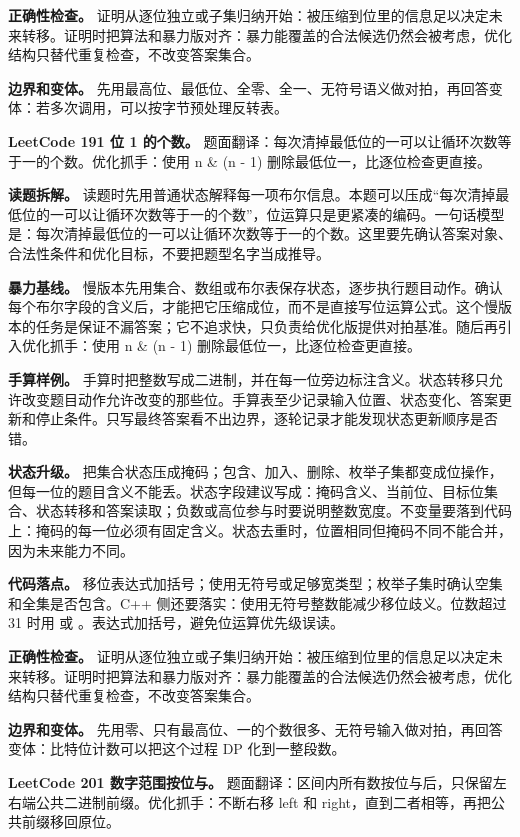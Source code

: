 \textbf{正确性检查。} 证明从逐位独立或子集归纳开始：被压缩到位里的信息足以决定未来转移。证明时把算法和暴力版对齐：暴力能覆盖的合法候选仍然会被考虑，优化结构只替代重复检查，不改变答案集合。

\textbf{边界和变体。} 先用最高位、最低位、全零、全一、无符号语义做对拍，再回答变体：若多次调用，可以按字节预处理反转表。

\noindent\textbf{LeetCode 191 位 1 的个数。} 题面翻译：每次清掉最低位的一可以让循环次数等于一的个数。优化抓手：使用 n \& (n - 1) 删除最低位一，比逐位检查更直接。

\textbf{读题拆解。} 读题时先用普通状态解释每一项布尔信息。本题可以压成“每次清掉最低位的一可以让循环次数等于一的个数”，位运算只是更紧凑的编码。一句话模型是：每次清掉最低位的一可以让循环次数等于一的个数。这里要先确认答案对象、合法性条件和优化目标，不要把题型名字当成推导。

\textbf{暴力基线。} 慢版本先用集合、数组或布尔表保存状态，逐步执行题目动作。确认每个布尔字段的含义后，才能把它压缩成位，而不是直接写位运算公式。这个慢版本的任务是保证不漏答案；它不追求快，只负责给优化版提供对拍基准。随后再引入优化抓手：使用 n \& (n - 1) 删除最低位一，比逐位检查更直接。

\textbf{手算样例。} 手算时把整数写成二进制，并在每一位旁边标注含义。状态转移只允许改变题目动作允许改变的那些位。手算表至少记录输入位置、状态变化、答案更新和停止条件。只写最终答案看不出边界，逐轮记录才能发现状态更新顺序是否错。

\textbf{状态升级。} 把集合状态压成掩码；包含、加入、删除、枚举子集都变成位操作，但每一位的题目含义不能丢。状态字段建议写成：掩码含义、当前位、目标位集合、状态转移和答案读取；负数或高位参与时要说明整数宽度。不变量要落到代码上：掩码的每一位必须有固定含义。状态去重时，位置相同但掩码不同不能合并，因为未来能力不同。

\textbf{代码落点。} 移位表达式加括号；使用无符号或足够宽类型；枚举子集时确认空集和全集是否包含。C++ 侧还要落实：使用无符号整数能减少移位歧义。位数超过 31 时用  或 。表达式加括号，避免位运算优先级误读。

\textbf{正确性检查。} 证明从逐位独立或子集归纳开始：被压缩到位里的信息足以决定未来转移。证明时把算法和暴力版对齐：暴力能覆盖的合法候选仍然会被考虑，优化结构只替代重复检查，不改变答案集合。

\textbf{边界和变体。} 先用零、只有最高位、一的个数很多、无符号输入做对拍，再回答变体：比特位计数可以把这个过程 DP 化到一整段数。

\noindent\textbf{LeetCode 201 数字范围按位与。} 题面翻译：区间内所有数按位与后，只保留左右端公共二进制前缀。优化抓手：不断右移 left 和 right，直到二者相等，再把公共前缀移回原位。

